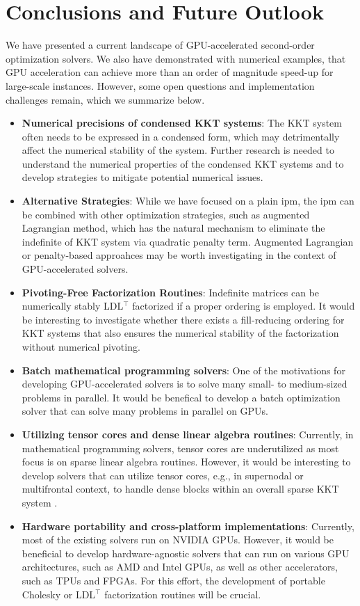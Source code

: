 \documentclass{article}
\begin{document}

\section{Conclusions and Future Outlook}\label{eqn:conclusion}
We have presented a current landscape of GPU-accelerated second-order optimization solvers.
We also have demonstrated with numerical examples, that GPU acceleration can achieve more than an order of magnitude speed-up for large-scale instances.
However, some open questions and implementation challenges remain, which we summarize below.
\begin{itemize}[leftmargin=*,itemsep=0pt,parsep=0pt,partopsep=0pt]
\item \textbf{Numerical precisions of condensed KKT systems}: The KKT system often needs to be expressed in a condensed form, which may detrimentally affect the numerical stability of the system. Further research is needed to understand the numerical properties of the condensed KKT systems and to develop strategies to mitigate potential numerical issues.
\item \textbf{Alternative Strategies}: While we have focused on a plain \gls*{ipm}, the \gls*{ipm} can be combined with other optimization strategies, such as augmented Lagrangian method, which has the natural mechanism to eliminate the indefinite of KKT system via quadratic penalty term. Augmented Lagrangian or penalty-based approahces may be worth investigating in the context of GPU-accelerated solvers.
\item \textbf{Pivoting-Free Factorization Routines}: Indefinite matrices can be numerically stably LDL$^\top$ factorized if a proper ordering is employed. It would be interesting to investigate whether there exists a fill-reducing ordering for KKT systems that also ensures the numerical stability of the factorization without numerical pivoting.
\item \textbf{Batch mathematical programming solvers}: One of the motivations for developing GPU-accelerated solvers is to solve many small- to medium-sized problems in parallel. It would be benefical to develop a batch optimization solver that can solve many problems in parallel on GPUs.
\item \textbf{Utilizing tensor cores and dense linear algebra routines}: Currently, in mathematical programming solvers, tensor cores are underutilized as most focus is on sparse linear algebra routines. However, it would be interesting to develop solvers that can utilize tensor cores, e.g., in supernodal or multifrontal context, to handle dense blocks within an overall sparse KKT system .
\item \textbf{Hardware portability and cross-platform implementations}: Currently, most of the existing solvers run on NVIDIA GPUs. However, it would be beneficial to develop hardware-agnostic solvers that can run on various GPU architectures, such as AMD and Intel GPUs, as well as other accelerators, such as TPUs and FPGAs. For this effort, the development of portable Cholesky or LDL$^\top$ factorization routines will be crucial.
\end{itemize}
\end{document}
